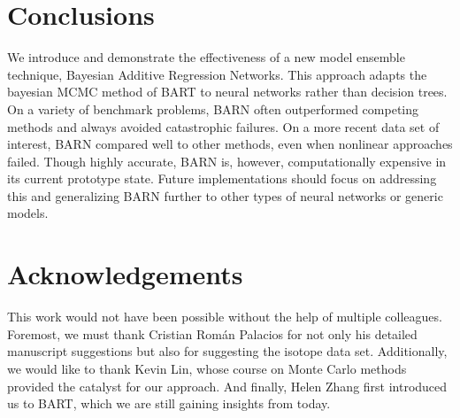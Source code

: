 \documentclass[12pt]{article}
\begin{document}
\section{Conclusions}

We introduce and demonstrate the effectiveness of a new model ensemble technique, Bayesian Additive Regression Networks.  This approach adapts the bayesian MCMC method of BART to neural networks rather than decision trees.  On a variety of benchmark problems, BARN often outperformed competing methods and always avoided catastrophic failures.  On a more recent data set of interest, BARN compared well to other methods, even when nonlinear approaches failed.  Though highly accurate, BARN is, however, computationally expensive in its current prototype state.  Future implementations should focus on addressing this and generalizing BARN further to other types of neural networks or generic models.

\section*{Acknowledgements}

This work would not have been possible without the help of multiple colleagues.  Foremost, we must thank Cristian Rom{\'a}n Palacios for not only his detailed manuscript suggestions but also for suggesting the isotope data set.  Additionally, we would like to thank Kevin Lin, whose course on Monte Carlo methods provided the catalyst for our approach.  And finally, Helen Zhang first introduced us to BART, which we are still gaining insights from today.

\clearpage


\end{document}
